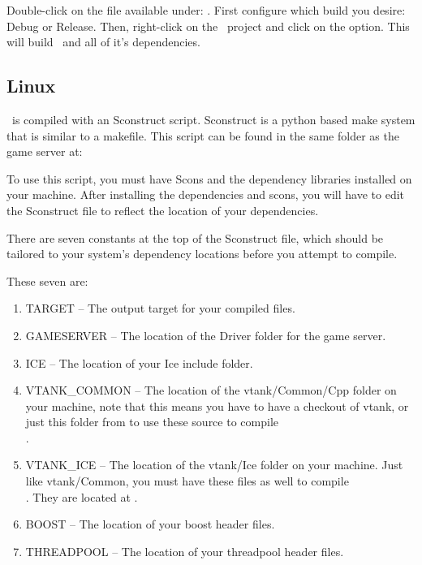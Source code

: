 Double-click on the  file available under: . First configure which build you desire: Debug or Release. Then, right-click on the \GameServer\ project and click on the  option. This will build \GameServer\ and all of it's dependencies.  



\subsection{Linux}

\GameServer\ is compiled with an Sconstruct script. Sconstruct is a python based make system that is similar to a makefile.  This script can be found in the same folder as the game server at:


To use this script, you must have Scons and the dependency libraries installed on your machine. After installing the dependencies and scons, you will have to edit the Sconstruct file to reflect the location of your dependencies.

There are seven constants at the top of the Sconstruct file, which should be tailored to your system's dependency locations before you attempt to compile.  

These seven are:

\begin{enumerate}
\item TARGET -- The output target for your compiled files.
\item GAMESERVER -- The location of the Driver folder for the game server.
\item ICE -- The location of your Ice include folder.
\item VTANK\_COMMON -- The location of the vtank/Common/Cpp folder on your machine, note that this means you have to have a checkout of vtank, or just this folder from  to use these source to compile \GameServer\\.
\item VTANK\_ICE -- The location of the vtank/Ice folder on your machine.  Just like vtank/Common, you must have these files as well to compile \GameServer\\.  They are located at .
\item BOOST -- The location of your boost header files.
\item THREADPOOL -- The location of your threadpool header files.
\end{enumerate}

